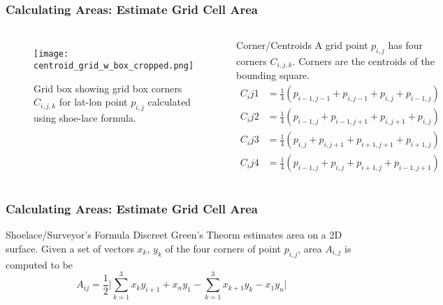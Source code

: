 \begin{frame}
\frametitle{Calculating Areas: Estimate Grid Cell Area}
\begin{columns}
\begin{figure}[ht]
\centering
\begin{minipage}{1\columnwidth}
\texttt{[image: centroid\_grid\_w\_box\_cropped.png]}
\caption{Grid box showing grid box corners $C_{i,j,k}$ for lat-lon point $p_{i,j}$ calculated using shoe-lace formula.}
\end{minipage}
\end{figure}
\begin{block}{Corner/Centroids}
A grid point $p_{i,j}$ has four corners $C_{i,j,k}$. Corners are the centroids of the bounding square.
\begin{align*}
C_ij1 &= \frac{1}{4}( p_{i-1,j-1}+ p_{i,j-1}+ p_{i,j} + p_{i-1,j} ) \\
C_ij2 &= \frac{1}{4}( p_{i-1,j}+ p_{i-1,j+1} + p_{i,j+1}+ p_{i,j} ) \\
C_ij3 &= \frac{1}{4}( p_{i,j}+ p_{i,j+1} + p_{i+1,j+1}+ p_{i+1,j} ) \\
C_ij4 &= \frac{1}{4}( p_{i-1,j}+ p_{i,j} + p_{i+1,j} + p_{i-1,j+1} )
\end{align*}
\end{block}
\end{columns}
\end{frame}

\begin{frame}
\frametitle{Calculating Areas: Estimate Grid Cell Area}
\begin{block}{Shoelace/Surveyor's Formula}
Discreet Green's Theorm estimates area on a 2D surface. Given a set of vectors $x_k$, $y_k$ of the four corners of point $p_{i,j}$, area $A_{i,j}$ is computed to be
\begin{equation*}
A_{ij} = \frac{1}{2} \vert \sum\limits_{k=1}^{3}x_{k}y_{i+1} + x_{n}y_{1} - \sum\limits_{k=1}^{3}x_{k+1}y_{k} - x_{1}y_{n} \vert 
\end{equation*}
\end{block}
\end{frame}

